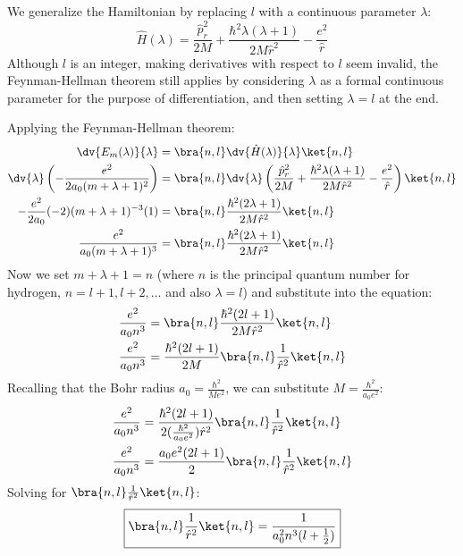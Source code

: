 \begin{solution}
  We generalize the Hamiltonian by replacing $l$ with a continuous
  parameter $\lambda$:
  \begin{equation} \label{eq:hydrogen_H_lambda}
    \hat H(\lambda) = \frac{\hat p_r^2}{2M} + \frac{\hbar^2
    \lambda(\lambda+1)}{2M\hat r^2} - \frac{e^2}{\hat r}
  \end{equation}
  Although $l$ is an integer, making derivatives with respect to
  $l$ seem invalid, the Feynman-Hellman theorem still applies by
  considering $\lambda$ as a formal continuous parameter for the
  purpose of differentiation, and then setting $\lambda=l$ at the end.

  Applying the Feynman-Hellman theorem:
  \begin{align} \label{eq:hydrogen_feynman_hellman_derivation}
    \dv{E_m(\lambda)}{\lambda} &= \bra{n,l}\dv{\hat
    H(\lambda)}{\lambda}\ket{n,l} \\
    \dv{\lambda}\left(-\frac{e^2}{2a_0(m+\lambda+1)^2}\right) &=
    \bra{n,l} \dv{\lambda}\left(\frac{\hat p_r^2}{2M} +
      \frac{\hbar^2 \lambda(\lambda+1)}{2M\hat r^2} -
    \frac{e^2}{\hat r}\right) \ket{n,l} \notag \\
    -\frac{e^2}{2a_0}(-2)(m+\lambda+1)^{-3}(1) &= \bra{n,l}
    \frac{\hbar^2(2\lambda + 1)}{2M \hat r^2} \ket{n,l} \notag \\
    \frac{e^2}{a_0(m+\lambda+1)^3} &= \bra{n,l}
    \frac{\hbar^2(2\lambda + 1)}{2M \hat r^2} \ket{n,l} \notag
  \end{align}
  Now we set $m+\lambda+1 = n$ (where $n$ is the principal quantum
    number for hydrogen, $n = l+1, l+2, \dots$ and also $\lambda =
  l$) and substitute into the equation:
  \begin{align}
    \frac{e^2}{a_0 n^3} &= \bra{n,l} \frac{\hbar^2(2l + 1)}{2M
    \hat r^2} \ket{n,l} \\
    \frac{e^2}{a_0 n^3} &= \frac{\hbar^2(2l + 1)}{2M} \bra{n,l}
    \frac{1}{\hat r^2} \ket{n,l} \notag
  \end{align}
  Recalling that the Bohr radius $a_0 = \frac{\hbar^2}{Me^2}$, we
  can substitute $M = \frac{\hbar^2}{a_0 e^2}$:
  \begin{align}
    \frac{e^2}{a_0 n^3} &= \frac{\hbar^2(2l +
    1)}{2(\frac{\hbar^2}{a_0 e^2}) \hat r^2} \bra{n,l}
    \frac{1}{\hat r^2} \ket{n,l} \notag \\
    \frac{e^2}{a_0 n^3} &= \frac{a_0 e^2 (2l + 1)}{2} \bra{n,l}
    \frac{1}{\hat r^2} \ket{n,l} \notag
  \end{align}
  Solving for $\bra{n,l} \frac{1}{\hat r^2} \ket{n,l}$:
  \begin{equation} \label{eq:r_minus_2_expectation_value}
    \boxed{\bra{n,l} \frac{1}{\hat r^2} \ket{n,l} =
    \frac{1}{a_0^2 n^3(l + \frac{1}{2})}}
  \end{equation}
\end{solution}

